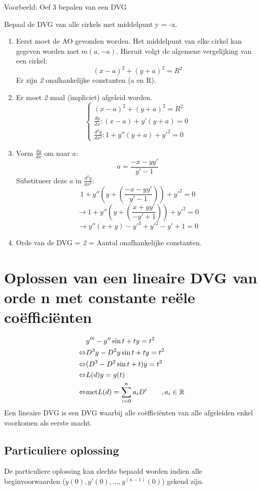 \documentclass[12pt]{report}
\newcommand{\example}[2]{
      \hrulefill
      
      Voorbeeld: #1
      
      #2
      
      \hrulefill
}
\begin{document}
\example{Oef 3 bepalen van een DVG}
{
  Bepaal de DVG van alle cirkels met middelpunt y = -x.
  \begin{enumerate}
   \item Eerst moet de AO gevonden worden. Het middelpunt van elke cirkel kan gegeven worden met $m(a, -a).$
    Hieruit volgt de algemene vergelijking van een cirkel: $$(x - a)^2 + (y + a)^2 = R^2$$
    Er zijn \textit{2} onafhankelijke constanten (a en R).
   \item Er moet \textit{2} maal (impliciet) afgeleid worden.
   \[
      \begin{cases}
       (x - a)^2 + (y + a)^2 = R^2 \\
       \frac{dy}{dx} : (x-a) + y'(y+a) = 0 \\
       \frac{d^2y}{dx^2} : 1 + y''(y + a) + y'^2 = 0
      \end{cases}
   \]
   \item
    Vorm $\frac{dy}{dx}$ om naar $a$:
    $$a = \frac{-x - yy'}{y' - 1}$$
    Substitueer deze $a$ in $\frac{d^2y}{dx^2}$:
    $$1 + y''(y + (\frac{-x - yy'}{y' - 1})) + y'^2 = 0$$
    $$\rightarrow 1 + y''(y + (\frac{x + yy'}{-y' + 1})) + y'^2 = 0$$
    $$\rightarrow y''(x + y) - y'^3 + y'^2 - y' + 1 = 0$$
   \item Orde van de DVG = \textit{2}  = Aantal onafhankelijke constanten.
  \end{enumerate}
}
\section{Oplossen van een lineaire DVG van orde n met constante reële coëfficiënten}
\begin{equation*}
 \begin{split}
		  & y''' - y''\sin t + ty = t^2 \\
  \Leftrightarrow & D^3y - D^2y\sin t + ty = t^2 \\
  \Leftrightarrow & (D^3 - D^2\sin t + t)y = t^2 \\
  \Leftrightarrow & L(d)y = g(t) \\
  \Leftrightarrow & \hbox{met} L(d) = \sum_{i = 0}^{n} a_iD^i \qquad ,a_i \in \mathbb{R}
 \end{split}
\end{equation*}
Een lineaire DVG is een DVG waarbij alle coëfficiënten van alle afgeleiden enkel voorkomen als eerste macht.
\subsection{Particuliere oplossing}
De particuliere oplossing kan slechts bepaald worden indien alle beginvoorwaarden ($y(0), y'(0),...,y^{(n-1)}(0)$) gekend zijn.
\end{document}
